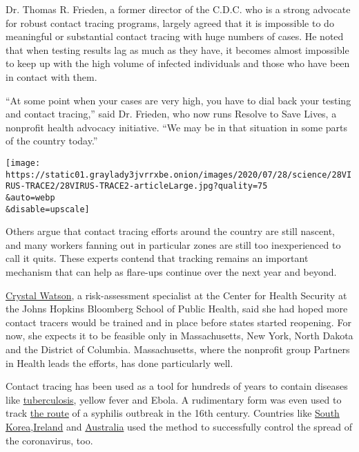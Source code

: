 Dr. Thomas R. Frieden, a former director of the C.D.C. who is a strong
advocate for robust contact tracing programs, largely agreed that it is
impossible to do meaningful or substantial contact tracing with huge
numbers of cases. He noted that when testing results lag as much as they
have, it becomes almost impossible to keep up with the high volume of
infected individuals and those who have been in contact with them.

``At some point when your cases are very high, you have to dial back
your testing and contact tracing,'' said Dr. Frieden, who now runs
Resolve to Save Lives, a nonprofit health advocacy initiative. ``We may
be in that situation in some parts of the country today.''

\texttt{[image: https://static01.graylady3jvrrxbe.onion/images/2020/07/28/science/28VIRUS-TRACE2/28VIRUS-TRACE2-articleLarge.jpg?quality=75\\\&auto=webp\\\&disable=upscale]}

Others argue that contact tracing efforts around the country are still
nascent, and many workers fanning out in particular zones are still too
inexperienced to call it quits. These experts contend that tracking
remains an important mechanism that can help as flare-ups continue over
the next year and beyond.

\href{https://www.centerforhealthsecurity.org/our-people/C\%20Watson/}{Crystal
Watson}, a risk-assessment specialist at the Center for Health Security
at the Johns Hopkins Bloomberg School of Public Health, said she had
hoped more contact tracers would be trained and in place before states
started reopening. For now, she expects it to be feasible only in
Massachusetts, New York, North Dakota and the District of Columbia.
Massachusetts, where the nonprofit group Partners in Health leads the
efforts, has done particularly well.

Contact tracing has been used as a tool for hundreds of years to contain
diseases like
\href{https://www.who.int/tb/areas-of-work/laboratory/contact-investigation/en/}{tuberculosis},
yellow fever and Ebola. A rudimentary form was even used to track
\href{https://theconversation.com/contact-tracing-how-physicians-used-it-500-years-ago-to-control-the-bubonic-plague-139248}{the
route} of a syphilis outbreak in the 16th century. Countries like
\href{https://www.forbes.com/sites/alexandrasternlicht/2020/04/30/south-koreas-widespread-testing-and-contact-tracing-lead-to-first-day-with-no-new-cases/}{South
Korea},\href{https://www.theguardian.com/world/2020/jul/20/cheap-popular-and-it-works-irelands-contact-tracing-app-success?CMP=Share_iOSApp_Other}{Ireland}
and
\href{https://www.aei.org/technology-and-innovation/a-tale-of-two-contact-tracing-apps-lessons-from-australia-and-new-zealand/}{Australia}
used the method to successfully control the spread of the coronavirus,
too.

